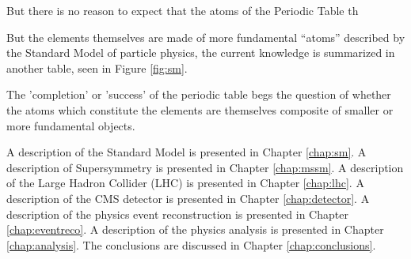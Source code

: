 But there is no reason to expect that the atoms of the Periodic Table th

But the elements themselves are made of more fundamental ``atoms'' described by the Standard Model of particle physics, the current knowledge is summarized in another table, seen in Figure \ref{fig:sm}.


The 'completion' or 'success' of the periodic table begs the question of whether the atoms which constitute the elements are themselves composite of smaller or more fundamental objects.


A description of the Standard Model is presented in Chapter \ref{chap:sm}. A description of Supersymmetry is presented in Chapter \ref{chap:mssm}. A description of the Large Hadron Collider (LHC) is presented in Chapter \ref{chap:lhc}. A description of the CMS detector is presented in Chapter \ref{chap:detector}. A description of the physics event reconstruction is presented in Chapter \ref{chap:eventreco}. A description of the physics analysis is presented in Chapter \ref{chap:analysis}. The conclusions are discussed in Chapter \ref{chap:conclusions}.
